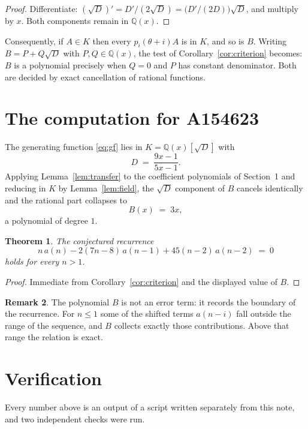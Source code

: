 \documentclass[11pt,a4paper]{article}
\theoremstyle{plain}
\newtheorem{theorem}{Theorem}
\theoremstyle{definition}
\newtheorem{remark}[theorem]{Remark}
\begin{document}
\begin{proof}
Differentiate: $(\sqrt{D})'=D'/(2\sqrt{D})=\bigl(D'/(2D)\bigr)\sqrt{D}$, and multiply by
$x$. Both components remain in $\mathbb{Q}(x)$.
\end{proof}

Consequently, if $A\in K$ then every $p_{i}(\theta+i)A$ is in $K$, and so is $B$. Writing
$B=P+Q\sqrt{D}$ with $P,Q\in\mathbb{Q}(x)$, the test of Corollary~\ref{cor:criterion}
becomes: $B$ is a polynomial precisely when $Q=0$ and $P$ has constant denominator. Both
are decided by exact cancellation of rational functions.

\section{The computation for A154623}

The generating function \eqref{eq:gf} lies in $K=\mathbb{Q}(x)[\sqrt{D}]$ with
\[
D \;=\; \frac{9 x - 1}{5 x - 1} .
\]
Applying Lemma~\ref{lem:transfer} to the coefficient polynomials of Section~1 and reducing
in $K$ by Lemma~\ref{lem:field}, the $\sqrt{D}$ component of $B$ cancels identically and
the rational part collapses to
\[
B(x)\;=\;3 x ,
\]
a polynomial of degree $1$.

\begin{theorem}
The conjectured recurrence
\[
n\,a(n) -  2 \left(7 n - 8\right)\,a(n-1) + 45 \left(n - 2\right)\,a(n-2) \;=\;0
\]
holds for every $n>1$.
\end{theorem}

\begin{proof}
Immediate from Corollary~\ref{cor:criterion} and the displayed value of $B$.
\end{proof}

\begin{remark}
The polynomial $B$ is not an error term: it records the boundary of the recurrence. For
$n\le1$ some of the shifted terms $a(n-i)$ fall outside the range of the sequence,
and $B$ collects exactly those contributions. Above that range the relation is exact.
\end{remark}

\section{Verification}

Every number above is an output of a script written separately from this note, and two
independent checks were run.
\end{document}
